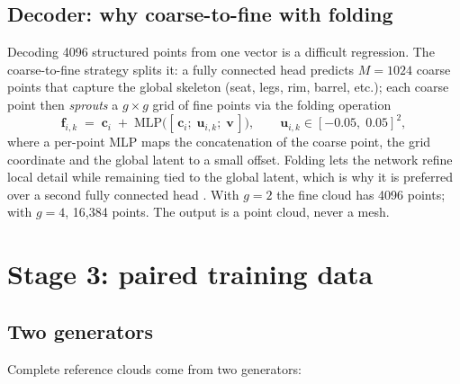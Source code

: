\subsection{Decoder: why coarse-to-fine with folding}
Decoding 4096 structured points from one vector is a difficult regression. The
coarse-to-fine strategy splits it: a fully connected head predicts $M=1024$
coarse points that capture the global skeleton (seat, legs, rim, barrel, etc.);
each coarse point then \emph{sprouts} a $g\times g$ grid of fine points via
the folding operation
\begin{equation}
  \mathbf{f}_{i,k} \;=\; \mathbf{c}_i \;+\;
  \mathrm{MLP}\big( [\,\mathbf{c}_i;\; \mathbf{u}_{i,k};\; \mathbf{v}\,]\big),
  \qquad \mathbf{u}_{i,k} \in [-0.05,\;0.05]^2 ,
  \label{eq:folding}
\end{equation}
where a per-point MLP maps the
concatenation of the coarse point, the grid coordinate and the global latent to
a small offset. Folding lets the network refine local detail while remaining
tied to the global latent, which is why it is preferred over a second fully
connected head \citep{yang2018folding,yuan2018pcn}. With $g=2$ the fine cloud
has 4096 points; with $g=4$, 16{,}384 points. The output is a point cloud,
never a mesh.

\section{Stage 3: paired training data}
\label{sec:routeB_data}

\subsection{Two generators}
\label{sec:routeB_generators}
Complete reference clouds come from two generators:

